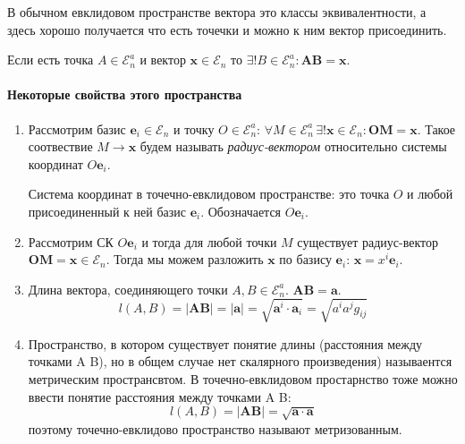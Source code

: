 В обычном евклидовом пространстве вектора это классы эквивалентности, а здесь хорошо получается 
что есть точечки и можно к ним вектор присоединить.

Если есть точка $A \in \mathcal{E}_n^a$ и вектор $\mathbf{x} \in \mathcal{E}_n$ то $\exists! B \in \mathcal{E}_n^a : \mathbf{AB} = \mathbf{x}$.

\paragraph{Некоторые свойства этого пространства}
\begin{enumerate}
  \item Рассмотрим базис $\mathbf{e}_i \in \mathcal{E}_n$ и точку $O \in \mathcal{E}_n^a$:
    $\forall M \in \mathcal{E}_n^a \, \exists! \mathbf{x} \in \mathcal{E}_n : \mathbf{OM} = \mathbf{x}$.
    Такое соотвествие $M \to \mathbf{x}$ будем называть \emph{радиус-вектором} относительно системы координат $O\mathbf{e}_i$.
    \begin{definition}
      Система координат в точечно-евклидовом пространстве: это точка $O$ и любой присоединенный к ней
      базис $\mathbf{e}_i$. Обозначается $O\mathbf{e}_i$.
    \end{definition}
   
  \item Рассмотрим СК $O\mathbf{e}_i$ и тогда для любой точки $M$ существует радиус-вектор $\mathbf{OM} = \mathbf{x} \in \mathcal{E}_n$.
    Тогда мы можем разложить $\mathbf{x}$ по базису $\mathbf{e}_i$: $\mathbf{x} = x^i \mathbf{e}_i$.
    
    \begin{figure}[H]
    	\centering
    	
    \end{figure}

  \item Длина вектора, соединяющего точки $A, B \in \mathcal{E}_n^a$. $\mathbf{AB} = \mathbf{a}$.
    \[
      l(A, B) = |\mathbf{AB}| = |\mathbf{a}| = \sqrt{\mathbf{a}^i \cdot \mathbf{a}_i} = \sqrt{a^i a^j g_{ij}}
    \]
    
  	\begin{figure}[H]
  		\centering
  		
  	\end{figure}

  \item Пространство, в котором существует понятие длины (расстояния между точками A B), но в
    общем случае нет скалярного произведения) называентся метрическим пространсвтом.
    В точечно-евклидовом простарнство тоже можно ввести понятие расстояния между точками A B:
    \[
      l(A, B) = |\mathbf{AB}| = \sqrt{\mathbf{a} \cdot \mathbf{a}}
    \]
    поэтому точечно-евклидово пространство называют метризованным.


\end{enumerate}
